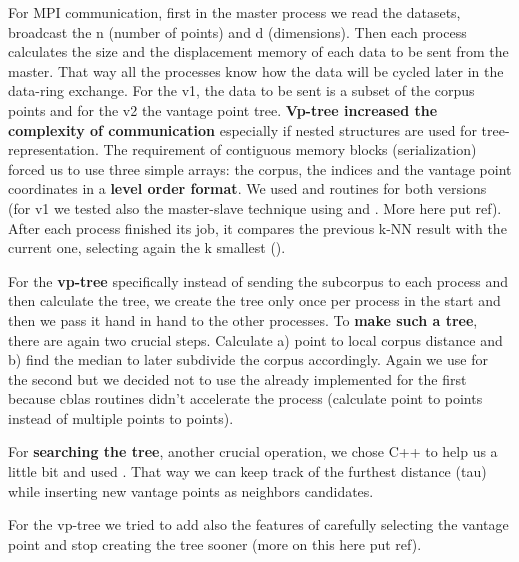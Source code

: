 \documentclass[12pt, a4paper]{article}
\begin{document}
For MPI communication, first in the master process we read the datasets, broadcast the n (number of points) and d (dimensions). Then each process calculates the size and the displacement memory of each data to be sent from the master. That way all the processes know how the data will be cycled later in the data-ring exchange. For the v1, the data to be sent is a subset of the corpus points and for the v2 the vantage point tree. \textbf{Vp-tree increased the complexity of communication} especially if nested structures are used for tree-representation. The requirement of contiguous memory blocks (serialization) forced us to use three simple arrays: the corpus, the indices and the vantage point coordinates in a \textbf{level order format}. We used  and  routines for both versions (for v1 we tested also the master-slave technique using  and . More here put ref). After each process finished its job, it compares the previous k-NN result with the current one, selecting again the k smallest ().

For the \textbf{vp-tree} specifically instead of sending the subcorpus to each process and then calculate the tree, we create the tree only once per process in the start and then we pass it hand in hand to the other processes. To \textbf{make such a tree}, there are again two crucial steps. Calculate a) point to local corpus distance and b) find the median to later subdivide the corpus accordingly. Again we use  for the second but we decided not to use the already implemented  for the first because cblas routines didn't accelerate the process (calculate point to points instead of multiple points to points). 

For \textbf{searching the tree}, another crucial operation, we chose C++ to help us a little bit and used . That way we can keep track of the furthest distance (tau) while inserting new vantage points as neighbors candidates.

For the vp-tree we tried to add also the features of carefully selecting the vantage point and stop creating the tree sooner (more on this here put ref).

\end{document}
